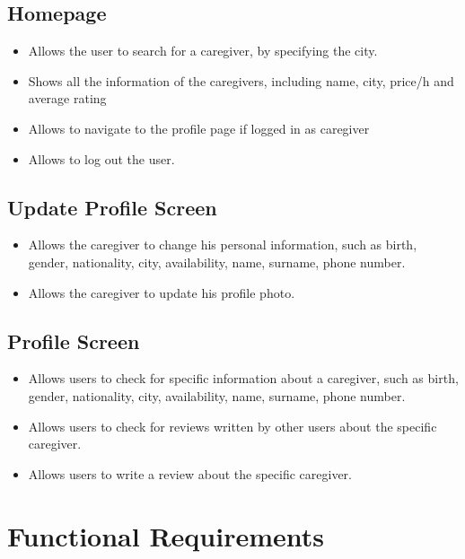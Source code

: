 \documentclass[../../dd.tex]{subfiles}
\begin{document}
    \subsection{Homepage}
    \begin{itemize}
        \item Allows the user to search for a caregiver, by specifying the city.
        \item Shows all the information of the caregivers, including name, city, price/h and average rating
        \item Allows to navigate to the profile page if logged in as caregiver
        \item Allows to log out the user.
    \end{itemize}

    \subsection{Update Profile Screen}
    \begin{itemize}
        \item Allows the caregiver to change his personal information, such as birth, gender, nationality,
        city, availability, name, surname, phone number.
        \item Allows the caregiver to update his profile photo.
    \end{itemize}

    \subsection{Profile Screen}
    \begin{itemize}
        \item Allows users to check for specific information about a caregiver, such as birth, gender, nationality,
        city, availability, name, surname, phone number.
        \item Allows users to check for reviews written by other users about the specific caregiver.
        \item Allows users to write a review about the specific caregiver.
    \end{itemize}

\section{Functional Requirements}
\end{document}

